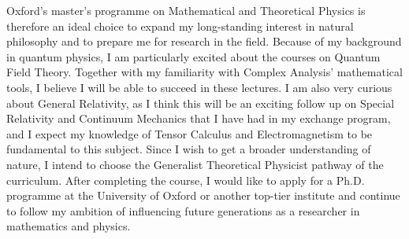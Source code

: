 \documentclass[10pt]{article}
\begin{document}
Oxford's master's programme on Mathematical and Theoretical Physics is therefore an ideal choice to expand my long-standing interest in natural philosophy and to prepare me for research in the field. Because of my background in quantum physics, I am particularly excited about the courses on Quantum Field Theory. Together with my familiarity with Complex Analysis' mathematical tools, I believe I will be able to succeed in these lectures. I am also very curious about General Relativity, as I think this will be an exciting follow up on Special Relativity and Continuum Mechanics that I have had in my exchange program, and I expect my knowledge of Tensor Calculus and Electromagnetism to be fundamental to this subject. Since I wish to get a broader understanding of nature, I intend to choose the Generalist Theoretical Physicist pathway of the curriculum. After completing the course, I would like to apply for a Ph.D. programme at the University of Oxford or another top-tier institute and continue to follow my ambition of influencing future generations as a researcher in mathematics and physics.

\end{document}
